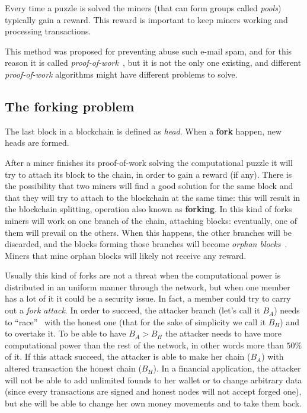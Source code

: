 Every time a puzzle is solved the miners (that can form groups called
\textit{pools}) typically gain a reward. This reward is important to keep miners
working and processing transactions.

This method was proposed for preventing abuse such e-mail spam, and for this
reason it is called \textit{proof-of-work}~\cite{back02}, but it is not the 
only one existing, and different \textit{proof-of-work} algorithms might have 
different problems to solve.

\subsection{The forking problem}
\label{sub:tfp}

The last block in a blockchain is defined as \textit{head}. When a
\textbf{fork} happen, new heads are formed.

After a miner finishes its proof-of-work solving the computational puzzle
it will try to attach its block to the chain, in order to gain a reward (if
any). There is the possibility that two miners will find a good solution for
the same block and that they will try to attach to the blockchain at the same
time: this will result in the blockchain splitting, operation also known as
\textbf{forking}. In this kind of forks miners will work on one branch of the
chain, attaching blocks: eventually, one of them will prevail on the others.
When this happens, the other branches will be discarded, and the blocks
forming those branches will become \textit{orphan blocks}~\cite{decker13}.
Miners that mine orphan blocks will likely not receive any reward.

Usually this kind of forks are not a threat when the computational power is
distributed in an uniform manner through the network, but when one member has a
lot of it it could be a security issue. In fact, a member could try to carry 
out a \textit{fork attack}. In order to succeed, the attacker branch (let's call 
it $B_A$) needs to ``race''~\cite{nakamoto08} with the honest one (that for the
sake of simplicity we call it $B_H$) and to overtake it. To be able to have
$B_A > B_H$ the attacker needs to have more computational power than the rest of
the network, in other words more than $50\%$ of it.
If this attack succeed, the attacker is able to make her chain ($B_A$) with
altered transaction the honest chain ($B_H$).
In a financial application, the attacker will not be able to add unlimited
founds to her wallet or to change arbitrary data (since every transactions are
signed and honest nodes will not accept forged one), but she will be able to
change her own money movements and to take them back.

